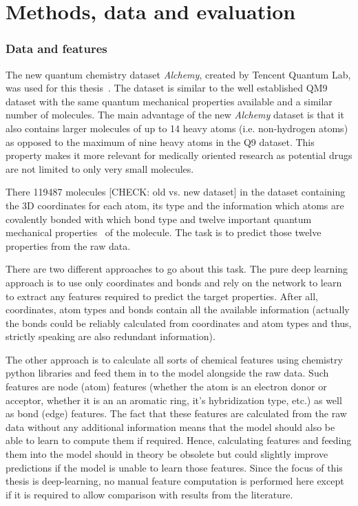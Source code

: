 \chapter{Methods, data and evaluation}
\label{chapter:Methods}


\subsection{Data and features}
\label{sec:data-and-features}

The new quantum chemistry dataset \textit{Alchemy}, created by Tencent Quantum Lab, was used for this thesis~\cite{Chen2019}. The dataset is similar to the well established QM9 dataset with the same quantum mechanical properties available and a similar number of molecules. The main advantage of the new \textit{Alchemy} dataset is that it also contains larger molecules of up to 14 heavy atoms (i.e. non-hydrogen atoms) as opposed to the maximum of nine heavy atoms in the Q9 dataset. This property makes it more relevant for medically oriented research as potential drugs are not limited to only very small molecules.

There 119487 molecules [CHECK: old vs. new dataset] in the dataset containing the 3D coordinates for each atom, its type and the information which atoms are covalently bonded with which bond type and twelve important quantum mechanical properties~\cite{Chen2019} of the molecule. The task is to predict those twelve properties from the raw data.

There are two different approaches to go about this task. The pure deep learning approach is to use only coordinates and bonds and rely on the network to learn to extract any features required to predict the target properties. After all, coordinates, atom types and bonds contain all the available information (actually the bonds could be reliably calculated from coordinates and atom types and thus, strictly speaking are also redundant information).

The other approach is to calculate all sorts of chemical features using chemistry python libraries and feed them in to the model alongside the raw data. Such features are node (atom) features (whether the atom is an electron donor or acceptor, whether it is an an aromatic ring, it's hybridization type, etc.) as well as bond (edge) features. The fact that these features are calculated from the raw data without any additional information means that the model should also be able to learn to compute them if required. Hence, calculating features and feeding them into the model should in theory be obsolete but could slightly improve predictions if the model is unable to learn those features. Since the focus of this thesis is deep-learning, no manual feature computation is performed here except if it is required to allow comparison with results from the literature.



